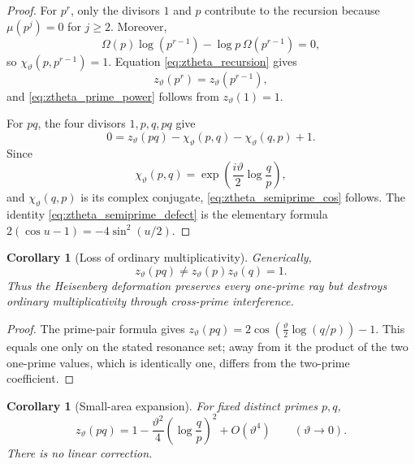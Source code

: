 \documentclass[11pt]{amsart}
\numberwithin{equation}{section}
\theoremstyle{plain}
\newtheorem{corollary}[theorem]{Corollary}
\theoremstyle{definition}
\theoremstyle{remark}
\newcommand{\Om}{\Omega}
\begin{document}
\begin{proof}
For $p^r$, only the divisors $1$ and $p$ contribute to the recursion because
$\mu(p^j)=0$ for $j\ge2$.  Moreover,
\begin{equation}
\Om(p)\log(p^{r-1})
-
\log p\,\Om(p^{r-1})
=0,
\label{eq:prime_power_symplectic_zero}
\end{equation}
so $\chi_{\vartheta}(p,p^{r-1})=1$.  Equation
\eqref{eq:ztheta_recursion} gives
\begin{equation}
z_{\vartheta}(p^r)=z_{\vartheta}(p^{r-1}),
\label{eq:prime_power_recursion}
\end{equation}
and \eqref{eq:ztheta_prime_power} follows from $z_{\vartheta}(1)=1$.

For $pq$, the four divisors $1,p,q,pq$ give
\begin{equation}
0
=
z_{\vartheta}(pq)
-
\chi_{\vartheta}(p,q)
-
\chi_{\vartheta}(q,p)
+1.
\label{eq:pq_inverse_equation}
\end{equation}
Since
\begin{equation}
\chi_{\vartheta}(p,q)
=
\exp\!\left(\frac{i\vartheta}{2}\log\frac{q}{p}\right),
\label{eq:chi_pq}
\end{equation}
and $\chi_{\vartheta}(q,p)$ is its complex conjugate,
\eqref{eq:ztheta_semiprime_cos} follows.  The identity
\eqref{eq:ztheta_semiprime_defect} is the elementary formula
$2(\cos u-1)=-4\sin^2(u/2)$.
\end{proof}

\begin{corollary}[Loss of ordinary multiplicativity]
\label{cor:loss_of_multiplicativity}
Generically,
\begin{equation}
z_{\vartheta}(pq)
\neq
z_{\vartheta}(p)z_{\vartheta}(q)=1.
\label{eq:loss_of_multiplicativity}
\end{equation}
Thus the Heisenberg deformation preserves every one-prime ray but destroys
ordinary multiplicativity through cross-prime interference.
\end{corollary}

\begin{proof}
The prime-pair formula gives
\(z_\vartheta(pq)=2\cos(\frac\vartheta2\log(q/p))-1\).  This equals one
only on the stated resonance set; away from it the product of the two
one-prime values, which is identically one, differs from the two-prime
coefficient.
\end{proof}

\begin{corollary}[Small-area expansion]
\label{cor:small_area_expansion}
For fixed distinct primes $p,q$,
\begin{equation}
z_{\vartheta}(pq)
=
1-
\frac{\vartheta^2}{4}
\left(\log\frac{q}{p}\right)^2
+O(\vartheta^4)
\qquad(\vartheta\to0).
\label{eq:small_theta_pq}
\end{equation}
There is no linear correction.
\end{corollary}
\end{document}
